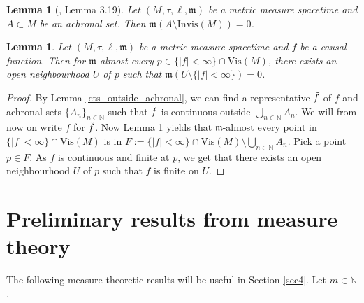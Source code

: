 \documentclass[a4paper,10pt]{article}
\newtheorem{lemma}[theorem]{Lemma}
\numberwithin{equation}{section}
\newcommand{\N}{\mathbb{N}}
\newcommand{\mm}{\mathfrak{m}}
\begin{document}
\smallskip
\begin{lemma}[\cite{beran2024nonlinear}, Lemma 3.19]\label{achronal_invisible}
    Let $(M, \tau, \ell, \mm)$ be a metric measure spacetime and $A \subset M$ be an achronal set. Then $\mm(A \setminus\mathrm{Invis}(M) ) =0$.
\end{lemma}

\smallskip
\begin{lemma}\label{local_finiteness}
    Let $(M, \tau, \ell, \mm)$ be a metric measure spacetime and $f$ be a causal function. Then for $\mm$-almost every $p\in \{|f|< \infty\}\cap \mathrm{Vis}(M)$, there exists an open neighbourhood $U$ of $p$ such that $\mm(U \setminus \{|f|< \infty\})=0$.
\end{lemma}
\begin{proof}
By Lemma \ref{cts_outside_achronal}, we can find a representative $\Tilde{f}$ of $f$ and achronal sets $\{A_n\}_{n\in \N}$ such that $\Tilde{f}$ is continuous outside $\bigcup_{n \in \N} A_n$. We will from now on write $f$ for $\Tilde{f}$. Now Lemma \ref{achronal_invisible} yields that $\mm$-almost every point in $\{|f|< \infty\}\cap \mathrm{Vis}(M)$ is in $F:=\{|f|< \infty\}\cap \mathrm{Vis}(M) \setminus \bigcup_{n \in \N} A_n$. Pick a point $p \in F$. As $f$ is continuous and finite at $p$, we get that there exists an open neighbourhood $U$ of $p$ such that $f$ is finite on $U$.
\end{proof}
 

\section{Preliminary results from measure theory}\label{sec3}
The following measure theoretic results will be useful in Section \ref{sec4}. Let $m \in \N$. 
\smallskip
\end{document}
